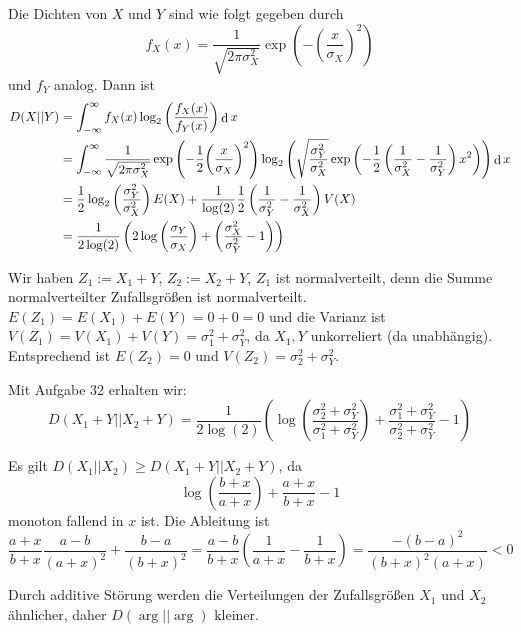\documentclass{article}
\begin{document}
\begin{solution}
    Die Dichten von $X$ und $Y$ sind wie folgt gegeben durch
    $$
    f_X(x)=\frac 1 {\sqrt{2\pi\sigma_X^2}}\exp(-{(\frac x {\sigma_X})}^2)
        $$ und $f_Y$ analog.
        Dann ist
        \begin{align*}
            D(X||Y) &= \int_{-\infty}^\infty{f_X(x)\log_2\left(\frac{f_X(x)}{f_Y(x)}\right)}\mathop\mathrm{d} x\\
            & = \int_{-\infty}^\infty{\frac 1 {\sqrt{2\pi\sigma_X^2}}\exp\left(-\frac 1 2{\left(\frac x {\sigma_X}\right)}^2\right)\log_2\left(\sqrt{\frac{\sigma_Y^2}{\sigma_X^2}}\exp\left(-\frac 1 2\left(\frac 1 {\sigma_X^2}-\frac 1 {\sigma_Y^2}\right)x^2\right)\right)}\mathop\mathrm{d} x\\
            & =
            \frac 1 2\log_2\left(\frac{\sigma_Y^2}{\sigma_X^2}\right)E(X)+\frac 1{\log(2)}\frac 1 2\left(\frac 1 {\sigma_Y^2}-\frac 1 {\sigma_X^2}\right)V(X)\\
            & = \frac 1 {2\log(2)}\left(2\log\left(\frac{\sigma_Y}{\sigma_X}\right)+\left(\frac{\sigma_X^2}{\sigma_Y^2}-1\right)\right)
        \end{align*}
\end{solution}

\begin{solution}
    Wir haben $Z_1:=X_1+Y$, $Z_2:=X_2+Y$, $Z_1$ ist normalverteilt, denn die Summe normalverteilter Zufallsgrößen ist normalverteilt. $E(Z_1)=E(X_1)+E(Y)=0+0=0$ und die Varianz ist $V(Z_1)=V(X_1)+V(Y)=\sigma_1^2+\sigma_Y^2$, da $X_1, Y$ unkorreliert (da unabhängig).
    Entsprechend ist $E(Z_2)=0$ und $V(Z_2)=\sigma_2^2+\sigma_Y^2$.
    \begin{tasks}
            \item Mit Aufgabe 32 erhalten wir:
        $$
        D(X_1+Y||X_2+Y)=\frac 1 {2\log(2)}\left(\log\left(\frac{\sigma_2^2+\sigma_Y^2}{\sigma_1^2+\sigma_Y^2}\right)+\frac{\sigma_1^2+\sigma_Y^2}{\sigma_2^2+\sigma_Y^2}-1\right)
        $$
            \item Es gilt $D(X_1||X_2)\geq D(X_1+Y||X_2+Y)$, da
        $$
        \log\left(\frac{b+x}{a+x}\right)+\frac{a+x}{b+x}-1
        $$
        monoton fallend in $x$ ist.
        Die Ableitung ist
        $$
        \frac{a+x}{b+x}\frac{a-b}{{(a+x)}^2}+\frac{b-a}{{(b+x)}^2} = \frac{a-b}{b+x}\left(\frac1 {a+x}-\frac 1 {b+x}\right)=\frac{-{(b-a)}^2}{ {(b+x)}^2(a+x)}<0
        $$
    \end{tasks}
    \begin{remark}
        Durch additive Störung werden die Verteilungen der Zufallsgrößen $X_1$ und $X_2$ ähnlicher, daher $D(\arg || \arg)$ kleiner.
    \end{remark}
\end{solution}
\end{document}
